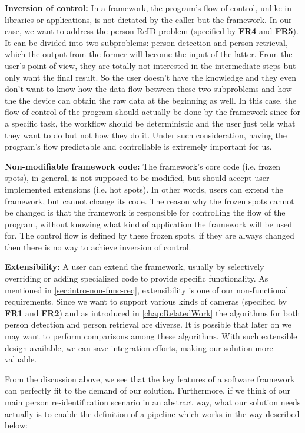 \noindent \textbf{Inversion of control:}
In a framework, the program's flow of control, unlike in libraries or
applications, is not dictated by the caller but the framework.
%
In our case, we want to address the person ReID problem (specified by
\textbf{FR4} and \textbf{FR5}). It can be
divided into two subproblems: person detection and person retrieval, which
the output from the former will become the input of the latter. From the user's
point of view, they are totally not interested in the intermediate steps but
only want the final result. So the user doesn't have the knowledge and they even
don't want to know how the data flow between these two subproblems and how the
the device can obtain the raw data at the beginning as well.
In this case, the flow of control of the program should actually be done
by the framework since for a specific task, the workflow should be 
deterministic and the user just tells what they want to do but not how they do 
it. Under such consideration, having the program's flow predictable and 
controllable is extremely important for us.

\noindent \textbf{Non-modifiable framework code:}
The framework's core code (i.e. frozen spots), in general, is not supposed to be
modified, but should accept user-implemented extensions (i.e. hot spots). In other
words, users can extend the framework, but cannot change its code.
The reason why the frozen spots cannot be changed is that the framework is
responsible for controlling the flow of the program, without knowing what
kind of application the framework will be used for. The control flow is defined
by these frozen spots, if they are always changed then there is no way to
achieve inversion of control.

\noindent \textbf{Extensibility:}
A user can extend the framework, usually by selectively overriding or adding
specialized code to provide specific functionality.
As mentioned in \autoref{sec:intro-non-func-req}, extensibility is one of our
non-functional requirements. Since we want to support various kinds of cameras
(specified by \textbf{FR1} and \textbf{FR2})
and as introduced in \autoref{chap:RelatedWork} the algorithms for both person
detection and person retrieval are diverse. It is possible that later on we may
want to perform comparisons among these algorithms. With such extensible design 
available, we can save integration efforts, making our 
solution more valuable.

From the discussion above, we see that the key features of a software
framework can perfectly fit to the demand of our solution. Furthermore,
if we think of our main person re-identification scenario in an abstract way,
what our solution needs actually is to enable the definition of a pipeline 
which works in the way described below:

